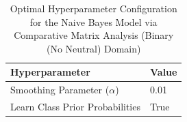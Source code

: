 \begin{table}[H]
    \centering
    \caption{Optimal Hyperparameter Configuration for the Naive Bayes Model via Comparative Matrix Analysis (Binary (No Neutral) Domain)}
    \label{tab:comparator_mnb_hyperparameters}
    \small
    \begin{tabular}{ll}
    \toprule
    \textbf{Hyperparameter} & \textbf{Value} \\
    \midrule
    Smoothing Parameter ($\alpha$) & 0.01 \\
    Learn Class Prior Probabilities & True \\
    \bottomrule
    \end{tabular}
    \end{table}

